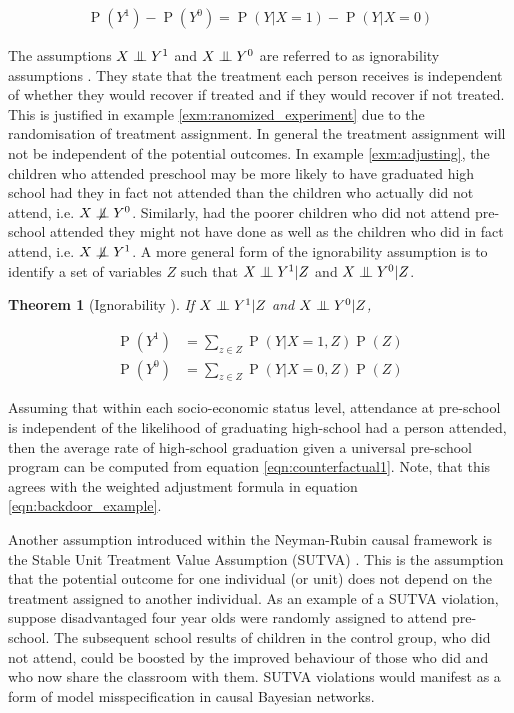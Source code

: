 \documentclass[11pt,a4paper,oneside]{book}
\newcommand{\eqn}[1]{\begin{align}#1\end{align}}
\newcommand{\eq}[1]{\begin{align*}#1\end{align*}}
\renewcommand{\P}[1]{\operatorname{P}\left(#1\right)}
\newcommand{\cf}[2]{{#1}^{#2}}
\theoremstyle{plain}
\newtheorem{theorem}{Theorem}
\theoremstyle{definition}
\newcommand{\ci}{\mathrel{\perp\mspace{-10mu}\perp}}
\newcommand{\nci}{\centernot{\ci}}
\begin{document}
\eq{
\P{Y^{1}}-\P{Y^{0}} = \P{Y|X=1} - \P{Y|X=0}
}

The assumptions $X \ci Y^{1}$ and $X \ci Y^{0}$  are referred to as ignorability assumptions \citep{Rosenbaum1983}. They state that the treatment each person receives is independent of whether they would recover if treated and if they would recover if not treated. This is justified in example \ref{exm:ranomized_experiment} due to the randomisation of treatment assignment. In general the treatment assignment will not be independent of the potential outcomes. In example \ref{exm:adjusting}, the children who attended preschool may be more likely to have graduated high school had they in fact not attended than the children who actually did not attend, i.e. $X \nci \cf{Y}{0}$. Similarly, had the poorer children who did not attend pre-school attended they might not have done as well as the children who did in fact attend, i.e. $X \nci \cf{Y}{1}$. A more general form of the ignorability assumption is to identify a set of variables $Z$ such that $X \ci Y^{1}|Z$ and $X \ci Y^{0}|Z$. 

\vspace*{.3cm}
\begin{theorem}[Ignorability \citep{Rosenbaum1983, Pearl2000}] If $X \ci Y^{1}|Z$ and $X \ci Y^{0}|Z$,

\eqn{
\label{eqn:counterfactual1}
\P{\cf{Y}{1}} &= \sum_{z \in Z}\P{Y|X=1,Z}\P{Z}  \\
\label{eqn:counterfactual2}
\P{\cf{Y}{0}} &= \sum_{z \in Z}\P{Y|X=0,Z}\P{Z}
}
\end{theorem}

Assuming that within each socio-economic status level, attendance at pre-school is independent of the likelihood of graduating high-school had a person attended, then the average rate of high-school graduation given a universal pre-school program can be computed from equation \ref{eqn:counterfactual1}. Note, that this agrees with the weighted adjustment formula in equation \ref{eqn:backdoor_example}. 

Another assumption introduced within the Neyman-Rubin causal framework is the Stable Unit Treatment Value Assumption (SUTVA) \citep{Rubin1978}. This is the assumption that the potential outcome for one individual (or unit) does not depend on the treatment assigned to another individual. As an example of a SUTVA violation, suppose disadvantaged four year olds were randomly assigned to attend pre-school. The subsequent school results of children in the control group, who did not attend, could be boosted by the improved behaviour of those who did and who now share the classroom with them. SUTVA violations would manifest as a form of model misspecification in causal Bayesian networks. 
\end{document}
